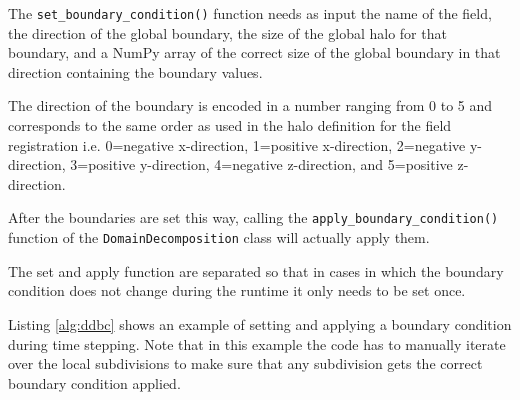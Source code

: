 The \texttt{set\_boundary\_condition()} function needs as input the name of the field, the direction of the global boundary, the size of the global halo for that boundary, and a NumPy array of the correct size of the global boundary in that direction containing the boundary values.

The direction of the boundary is encoded in a number ranging from 0 to 5 and corresponds to the same order as used in the halo definition for the field registration i.e. 0=negative x-direction, 1=positive x-direction, 2=negative y-direction, 3=positive y-direction, 4=negative z-direction, and 5=positive z-direction.

After the boundaries are set this way, calling the \texttt{apply\_boundary\_condition()} function of the \texttt{DomainDecomposition} class will actually apply them.

The set and apply function are separated so that in cases in which the boundary condition does not change during the runtime it only needs to be set once.

Listing \ref{alg:ddbc} shows an example of setting and applying a boundary condition during time stepping.
Note that in this example the code has to manually iterate over the local subdivisions to make sure that any subdivision gets the correct boundary condition applied.

